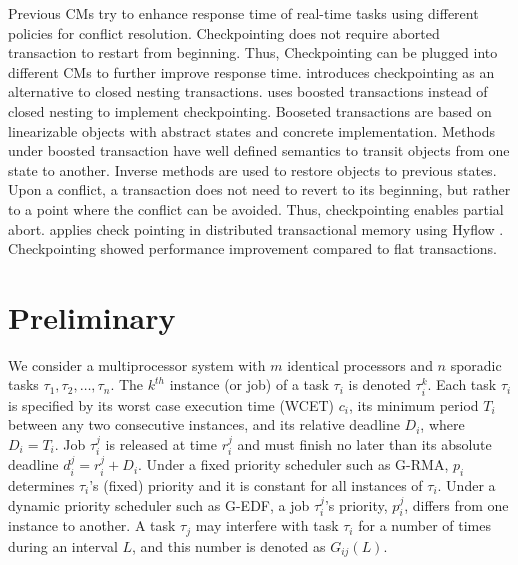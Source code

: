 \documentclass[conference]{IEEEtran}
\begin{document}
Previous CMs try to enhance response time of real-time tasks using different policies for conflict resolution. Checkpointing does not require aborted transaction to restart from beginning. Thus, Checkpointing can be plugged into different CMs to further improve response time. \cite{Koskinen:2008:CCI:1378533.1378563} introduces checkpointing as an alternative to closed nesting transactions\cite{turcu2012closed}. \cite{Koskinen:2008:CCI:1378533.1378563} uses boosted transactions \cite{Herlihy:2008:TBM:1345206.1345237} instead of closed nesting \cite{Peri:2011:CCE:1946143.1946152,turcu2012closed,6267834} to implement checkpointing. Booseted transactions are based on linearizable objects with abstract states and concrete implementation. Methods under boosted transaction have well defined semantics to transit objects from one state to another. Inverse methods are used to restore objects to previous states. Upon a conflict, a transaction does not need to revert to its beginning, but rather to a point where the conflict can be avoided. Thus, checkpointing enables partial abort. \cite{turcu_phd_proposal} applies check pointing in distributed transactional memory using Hyflow \cite{Saad:2011:HHP:1996130.1996167}. Checkpointing showed performance improvement compared to flat transactions.
%
\section{Preliminary}

We consider a multiprocessor system with $m$ identical processors and $n$ sporadic tasks $\tau_1, \tau_2,\ldots, \tau_n$. The $k^{th}$ instance (or job) of a task $\tau_i$ is denoted $\tau_i^k$. Each task $\tau_i$ is specified by its worst case execution time (WCET) $c_i$, its minimum period $T_i$ between any two consecutive instances, and its relative deadline $D_i$, where $D_i=T_i$. Job $\tau_i^j$ is released at time $r_i^j$ and must finish no later than its absolute deadline $d_i^j=r_i^j+D_i$. Under a fixed priority scheduler such as G-RMA, $p_i$ determines $\tau_i$'s (fixed) priority and it is constant for all instances of $\tau_i$. Under a dynamic priority scheduler such as G-EDF, a job $\tau_i^j$'s priority, $p_i^j$, differs from one instance to another. 
A task $\tau_j$ may interfere with task $\tau_i$ for a number of times during an interval $L$, and this number is denoted as $G_{ij}(L)$. 
\end{document}

